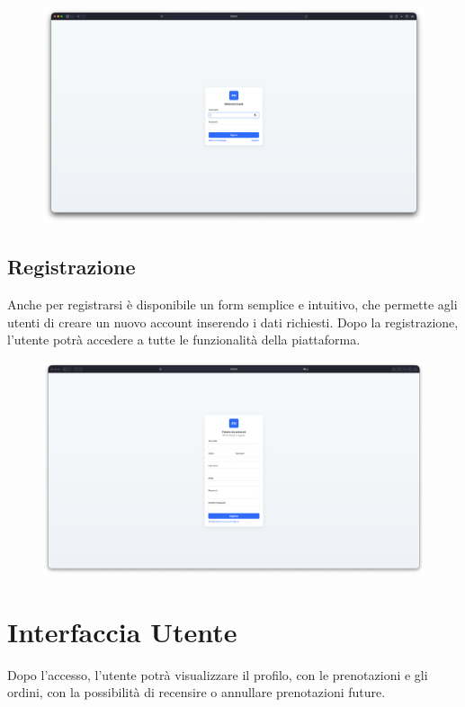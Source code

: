 \documentclass[a4paper,12pt]{report}
\begin{document}
\begin{figure}[H]
    \centering
    \includegraphics[width=\textwidth, trim=0 0 0 0]{./img/login.png}
    \vspace{-1em}
    \label{fig:login}
\end{figure}

\subsection*{Registrazione}
Anche per registrarsi è disponibile un form semplice e intuitivo, che permette agli utenti di creare un nuovo 
account inserendo i dati richiesti. Dopo la registrazione, l'utente potrà accedere a tutte le funzionalità della 
piattaforma.

\begin{figure}[H]
    \centering
    \includegraphics[width=\textwidth, trim=0 0 0 0]{./img/register.png}
    \vspace{-1em}
    \label{fig:registrazione}
\end{figure}

\newpage
\section{Interfaccia Utente}
Dopo l'accesso, l'utente potrà visualizzare il profilo, con le prenotazioni e gli ordini, con 
la possibilità di recensire o annullare prenotazioni future.
\end{document}
